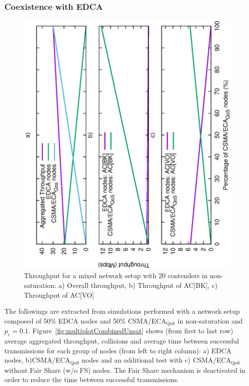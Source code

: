 \subsubsection{Coexistence with EDCA}
\begin{figure}[t!]
	\centering
		\includegraphics[width=1.1\linewidth,angle = -90]{figures/legacyEvolution.eps}
		\caption{Throughput for a mixed network setup with 20 contenders in non-saturation: a) Overall throughput, b) Throughput of AC[BK], c) Throughput of AC[VO]}
		\label{fig:legacyEvolution}
\end{figure}
	
The followings are extracted from simulations performed with a network setup composed of 50\% EDCA nodes and 50\% CSMA/ECA$_{\text{QoS}}$ in non-saturation and $p_e=0.1$. Figure~\ref{fig:multiplotCombinedUnsat} shows (from first to last row) average aggregated throughput, collisions and average time between successful transmissions for each group of nodes (from left to right column): a) EDCA nodes, b)CSMA/ECA$_{\text{QoS}}$ nodes and an additional test with c) CSMA/ECA$_{\text{QoS}}$ without Fair Share (w/o FS) nodes. The Fair Share mechanism is deactivated in order to reduce the time between successful transmissions.

